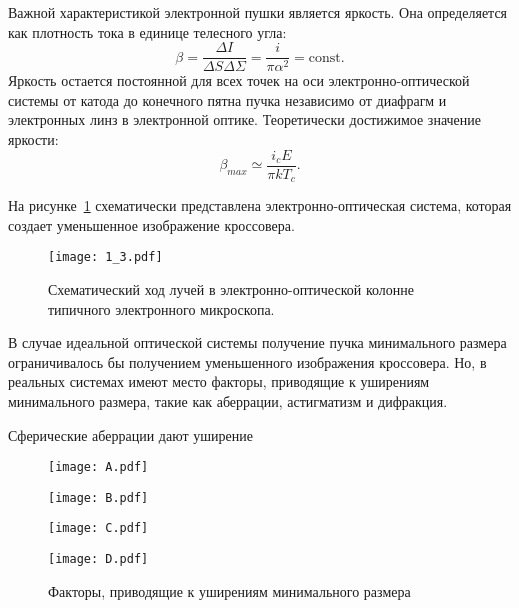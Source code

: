 Важной характеристикой электронной пушки является яркость. Она определяется как плотность тока в единице телесного угла:
\begin{equation}
\beta = \frac{\Delta I}{\Delta S\Delta\Sigma}= \frac{i}{\pi \alpha^2}= \mathrm{const}.
\label{eq:A2}
\end{equation}
Яркость остается постоянной для всех точек на оси электронно-оптической системы от катода до конечного пятна пучка независимо от диафрагм и электронных линз в электронной оптике. Теоретически достижимое значение яркости:
\begin{equation}
\beta_{max} \simeq \frac{i_c E}{\pi kT_c}.
\label{eq:A3}
\end{equation}

На рисунке~\ref{fig:3} схематически представлена электронно-оптическая система, которая создает уменьшенное изображение кроссовера.
\begin{figure}[H]
\center
\texttt{[image: 1\_3.pdf]}
\caption{Схематический ход лучей в электронно-оптической колонне типичного электронного микроскопа.}
\label{fig:3}
\end{figure}

В случае идеальной оптической системы получение пучка минимального размера ограничивалось бы получением уменьшенного изображения кроссовера. Но, в реальных системах имеют место факторы, приводящие к уширениям минимального размера, такие как аберрации, астигматизм и дифракция.

Сферические аберрации дают уширение

\begin{figure}
    \center
    \texttt{[image: A.pdf]}
    \parbox[t]{.95\textwidth}{}
    \texttt{[image: B.pdf]}
    \parbox[t]{.95\textwidth}{}
    \texttt{[image: C.pdf]}
    \parbox[t]{.95\textwidth}{}
    \texttt{[image: D.pdf]}
    \parbox[t]{.95\textwidth}{}
    \caption{Факторы, приводящие к уширениям минимального размера}
\end{figure}

